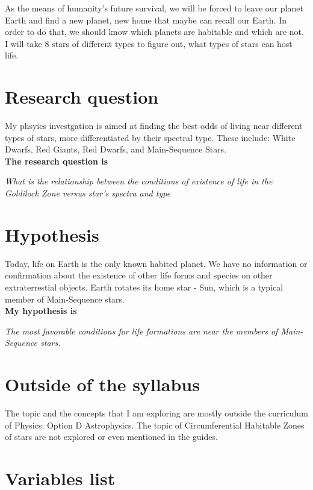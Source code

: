 \documentclass[a4paper,12pt]{article}
\begin{document}
As the means of humanity's future survival, we will be forced to leave our planet Earth and find a new planet, new home that maybe can recall our Earth. In order to do that, we should know which planets are habitable and which are not. I will take 8 stars of different types to figure out, what types of stars can host life.

\section{Research question}

My phsyics investgation is aimed at finding the best odds of living near different types of stars, more differentiated by their spectral type. These include: White Dwarfs, Red Giants, Red Dwarfs, and Main-Sequence Stars.\\

\textbf{The research question is}

\textit{What is the relationship between the conditions of existence of life in the Goldilock Zone versus star's spectra and type }

\section{Hypothesis}

Today, life on Earth is the only known habited planet. We have no information or confirmation about the existence of other life forms and species on other extraterrestial objects. Earth rotates its home star - Sun, which is a typical member of Main-Sequence stars.\\

\textbf{My hypothesis is}

  \textit{The most favorable conditions for life formations are near the members of Main-Sequence stars.}

  \section{Outside of the syllabus}

  The topic and the concepts that I am exploring are mostly outside the curriculum of Physics: Option D Astrophysics. The topic of Circumferential Habitable Zones of stars are not explored or even mentioned in the guides.
  
  \newpage
 \onehalfspacing
  \section{Variables list}
\end{document}
